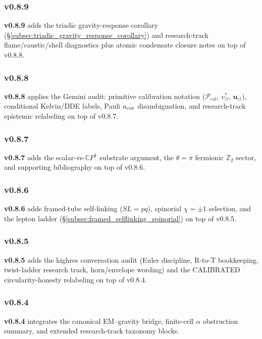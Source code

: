 \documentclass[11pt]{article}
\theoremstyle{definition}
\theoremstyle{plain}
\theoremstyle{remark}
\newcommand{\vchar}{v_{\!\boldsymbol{\circlearrowleft}}^{\ast}}
\newcommand{\uswirl}{\mathbf{u}_{\!\boldsymbol{\circlearrowleft}}}
\begin{document}
        \subsubsection{v0.8.9}
            \textbf{v0.8.9} adds the triadic gravity-response corollary (\S\ref{subsec:triadic_gravity_response_corollary}) and research-track flame/caustic/shell diagnostics plus atomic condensate closure notes on top of v0.8.8.

        \subsubsection{v0.8.8}
            \textbf{v0.8.8} applies the Gemini audit: primitive calibration notation ($\mathcal{P}_{\mathrm{cal}}$, $\vchar$, $\uswirl$), conditional Kelvin/DDE labels, Pauli $a_{\rm cut}$ disambiguation, and research-track epistemic relabeling on top of v0.8.7.

        \subsubsection{v0.8.7}
            \textbf{v0.8.7} adds the scalar-vs-$\mathbb{C}P^1$ substrate argument, the $\theta=\pi$ fermionic $\mathbb{Z}_2$ sector, and supporting bibliography on top of v0.8.6.

        \subsubsection{v0.8.6}
            \textbf{v0.8.6} adds framed-tube self-linking ($SL=pq$), spinorial $\chi=\pm1$ selection, and the lepton ladder (\S\ref{subsec:framed_selflinking_spinorial}) on top of v0.8.5.

        \subsubsection{v0.8.5}
            \textbf{v0.8.5} adds the highres conversation audit (Euler discipline, R-to-T bookkeeping, twist-ladder research track, horn/envelope wording) and the CALIBRATED circularity-honesty relabeling on top of v0.8.4.

        \subsubsection{v0.8.4}
            \textbf{v0.8.4} integrates the canonical EM--gravity bridge, finite-cell $\alpha$ obstruction summary, and extended research-track taxonomy blocks.
\end{document}
